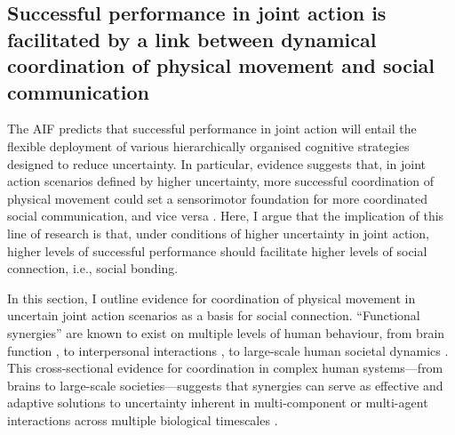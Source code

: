 \begin{CJK}{UTF8}{gbsn}


\subsection{Successful performance in joint action is facilitated by a link between dynamical coordination of physical movement and social communication\label{sect:coordinationPerform}}

The AIF predicts that successful performance in joint action will entail the flexible deployment of various hierarchically organised cognitive strategies designed to reduce uncertainty.  In particular, evidence suggests that, in joint action scenarios defined by higher uncertainty, more successful coordination of physical movement could set a sensorimotor foundation for more coordinated social communication, and vice versa \citep{Wheatley2016}. Here, I argue that the implication of this line of research is that, under conditions of higher uncertainty in joint action, higher levels of successful performance should facilitate higher levels of social connection, i.e., social bonding.

In this section, I outline evidence for coordination of physical movement in uncertain joint action scenarios as a basis for social connection.  ``Functional synergies'' are known to exist on multiple levels of human behaviour, from brain function \citep{Yufik1998,Sengupta2013,Kelso2013}, to interpersonal interactions \citep{Kelso2009,Riley2011,Fusaroli2014}, to large-scale human societal dynamics \citep{Nowak2017}. This cross-sectional evidence for coordination in complex human systems---from brains to large-scale societies---suggests that synergies can serve as effective and adaptive solutions to uncertainty inherent in multi-component or multi-agent interactions across multiple biological timescales \citep{Nowak2017}.


\end{CJK}
